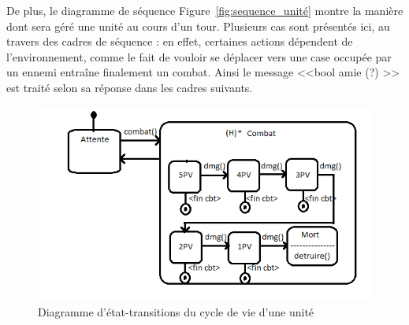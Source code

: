\documentclass[a4paper]{article}%
\begin{document}
\medskip	

De plus, le diagramme de séquence Figure~\ref{fig:sequence_unité} montre la manière dont sera géré une unité au cours d'un tour. Plusieurs cas sont présentés ici, au travers des cadres de séquence : en effet, certaines actions dépendent de l'environnement, comme le fait de vouloir se déplacer vers une case occupée par un ennemi entraîne finalement un combat. Ainsi le message <<bool amie (?) >> est traité selon sa réponse dans les cadres suivants.

\begin{figure}[H]
    \centering
    \includegraphics[width=\textwidth]{./images/state_transition/DiagEtatTransitionUnite.png}
                \caption{Diagramme d'état-transitions du cycle de vie d'une unité}
                \label{fig:state_transition_cycleviedeunité}
\end{figure}
\end{document}
